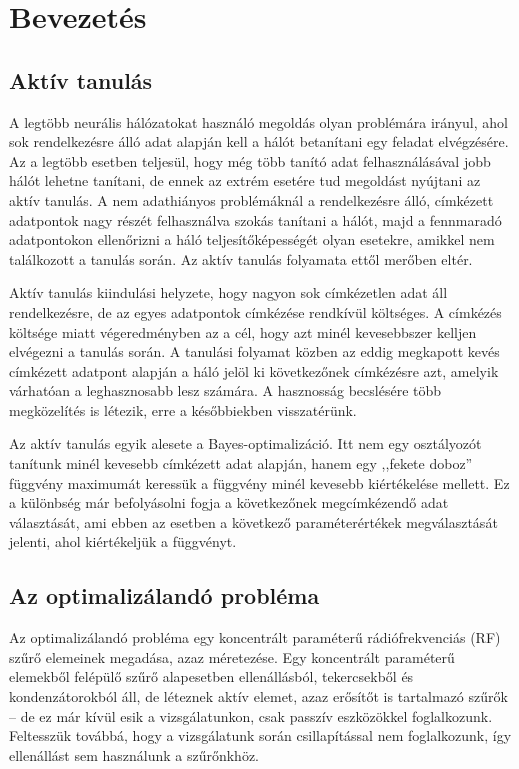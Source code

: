 \section{Bevezetés}
	\subsection{Aktív tanulás}
		A legtöbb neurális hálózatokat használó megoldás olyan problémára irányul, ahol sok rendelkezésre álló adat alapján kell a hálót betanítani egy feladat elvégzésére. Az a legtöbb esetben teljesül, hogy még több tanító adat felhasználásával jobb hálót lehetne tanítani, de ennek az extrém esetére tud megoldást nyújtani az aktív tanulás. A nem adathiányos problémáknál a rendelkezésre álló, címkézett adatpontok nagy részét felhasználva szokás tanítani a hálót, majd a fennmaradó adatpontokon ellenőrizni a háló teljesítőképességét olyan esetekre, amikkel nem találkozott a tanulás során. Az aktív tanulás folyamata ettől merőben eltér.

		Aktív tanulás kiindulási helyzete, hogy nagyon sok címkézetlen adat áll rendelkezésre, de az egyes adatpontok címkézése rendkívül költséges. A címkézés költsége miatt végeredményben az a cél, hogy azt minél kevesebbszer kelljen elvégezni a tanulás során. A tanulási folyamat közben az eddig megkapott kevés címkézett adatpont alapján a háló jelöl ki következőnek címkézésre azt, amelyik várhatóan a leghasznosabb lesz számára. A hasznosság becslésére több megközelítés is létezik, erre a későbbiekben visszatérünk.

		Az aktív tanulás egyik alesete a Bayes-optimalizáció. Itt nem egy osztályozót tanítunk minél kevesebb címkézett adat alapján, hanem egy ,,fekete doboz'' függvény maximumát keressük a függvény minél kevesebb kiértékelése mellett. Ez a különbség már befolyásolni fogja a következőnek megcímkézendő adat választását, ami ebben az esetben a következő paraméterértékek megválasztását jelenti, ahol kiértékeljük a függvényt.
	\subsection{Az optimalizálandó probléma}
		Az optimalizálandó probléma egy koncentrált paraméterű rádiófrekvenciás (RF) szűrő elemeinek megadása, azaz méretezése. Egy koncentrált paraméterű elemekből felépülő szűrő alapesetben ellenállásból, tekercsekből és kondenzátorokból áll, de léteznek aktív elemet, azaz erősítőt is tartalmazó szűrők -- de ez már kívül esik a vizsgálatunkon, csak passzív eszközökkel foglalkozunk. Feltesszük továbbá, hogy a vizsgálatunk során csillapítással nem foglalkozunk, így ellenállást sem használunk a szűrőnkhöz.
		

